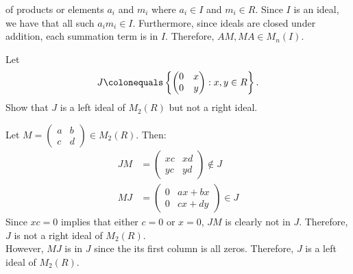 \begin{problem}
\begin{enumalph}
\begin{Answer}
        of products or elements $a_i$ and $m_i$ where $a_i \in I$ and $m_i \in R$.
        Since $I$ is an ideal, we have that all such $a_im_i \in I$.
        Furthermore, since ideals are closed under addition, each summation term is in $I$.
        Therefore, $AM, MA \in M_n(I)$. %
      \end{Answer}
    \newpage
    \item Let
      \[
        J \colonequals \left\{\begin{pmatrix} 0 & x \\ 0 & y \end{pmatrix}
          : x,y \in R \right\}.
      \]
    Show that $J$ is a left ideal of $M_2(R)$ but not a right ideal.
    \begin{Answer}
      Let $M = \begin{pmatrix} a & b \\ c & d \end{pmatrix} \in M_2(R)$.
      Then:
      \begin{align*}
        JM &= \begin{pmatrix}
          xc &  xd \\ yc & yd
        \end{pmatrix}
        \notin J \\
        MJ &= \begin{pmatrix}
          0 & ax + bx \\ 0 & cx + dy
        \end{pmatrix} \in J
      \end{align*}
      Since $xc = 0$ implies that either $c = 0$ or $x = 0$, $JM$ is clearly not in $J$.
      Therefore, $J$ is not a right ideal of $M_2(R)$. \\
      However, $MJ$ is in $J$ since the its first column is all zeros.
      Therefore, $J$ is a left ideal of $M_2(R)$.
    \end{Answer}


\end{enumalph}
\end{problem}
